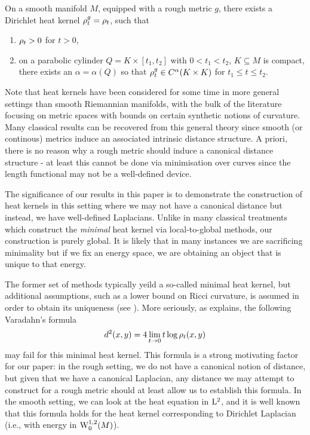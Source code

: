 \documentclass[a4paper, 12pt]{amsart}
\begin{document}
\begin{thm}
On a smooth manifold \(M\), equipped with a rough metric \(g\), there exists a 
Dirichlet heat kernel \(\hk_t^g = \hk_t\), such that
\begin{enumerate}
\item \(\hk_t > 0\) for \(t > 0\),
\item on a parabolic cylinder \(Q = K \times [t_1, t_2]\) with \(0 < t_1 < t_2\), \(K \subseteq M\) is compact, there exists an \(\alpha = \alpha(Q)\) so that \(\hk_t^g \in C^{\alpha}(K \times K)\) for \(t_1 \leq t \leq t_2\).
\end{enumerate}
\end{thm}


Note that heat kernels have been considered
for some time in more general settings than smooth Riemannian manifolds,
with the bulk of the literature focusing on metric spaces with bounds
on certain synthetic notions of curvature.
Many classical results can be recovered from this general 
theory since smooth (or continous) metrics induce an associated intrinsic
distance structure. A priori, there is no reason
why a rough metric should induce a canonical distance structure - at least
this cannot be done via minimisation over curves since the
length functional may not be a well-defined device. 

The significance of our results in this paper is to demonstrate
the construction of heat kernels in this setting where we may 
not have a canonical distance but instead, we have well-defined Laplacians. 
Unlike in many classical treatments which construct the \emph{minimal} 
heat kernel via local-to-global methods, our construction is purely global.
It is likely that in many instances we are sacrificing minimality but if we fix
an energy space, we are obtaining an object that is unique to that energy.

The former set of methods typically yeild a so-called minimal heat kernel,
but additional assumptions, such as a lower bound on Ricci curvature,
is assumed in order to obtain its uniqueness (see \cite{Chavel}).
More seriously, as \cite{??} explains, the following Varadahn's formula
$$ d^2(x,y) = 4 \lim_{t \to 0} t \log \hk_t(x,y)$$
may fail for this minimal heat kernel. 
This formula is a strong motivating factor for our paper: 
in the rough setting, we do not have a canonical notion of
distance, but given that we have a canonical Laplacian, 
any distance we may attempt to construct for a rough 
metric should at least allow us to establish this formula.
In the smooth setting, we can look at the heat equation
in $\Lp{2}$, and it is well known that
this formula holds for the heat kernel corresponding to Dirichlet Laplacian (i.e., 
with energy in $\SobH[0]{1}(M)$). 
\end{document}
